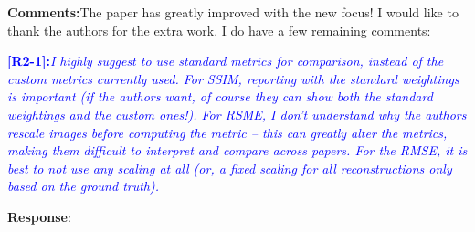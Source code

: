 \documentclass[11pt]{article}
\begin{document}
\textbf{Comments:}The paper has greatly improved with the new focus! I
would like to thank the authors for the extra work. I do have a few
remaining comments:

\vspace{0.5cm}\textcolor{blue}{\textbf{[R2-1]:}\textit{I highly suggest to use
    standard metrics for comparison, instead of the custom metrics
    currently used. For SSIM, reporting with the standard weightings
    is important (if the authors want, of course they can show both
    the standard weightings and the custom ones!). For RSME, I don't
    understand why the authors rescale images before computing the
    metric -- this can greatly alter the metrics, making them
    difficult to interpret and compare across papers. For the RMSE, it
    is best to not use any scaling at all (or, a fixed scaling for all
    reconstructions only based on the ground truth).  }}

\textbf{Response}:
\end{document}
